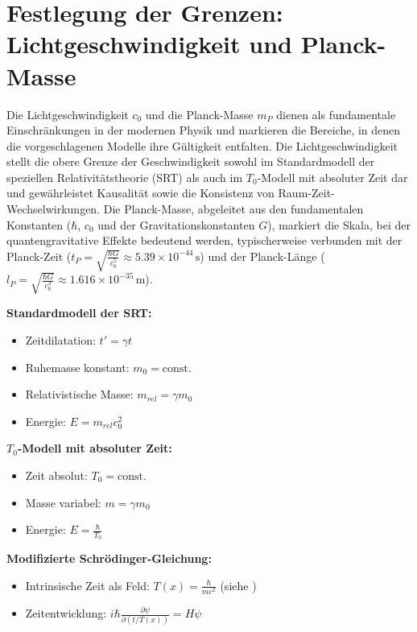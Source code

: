 \documentclass[a4paper,12pt]{article}
\newcommand{\Tfield}{T(x)}
\begin{document}
	\section{Festlegung der Grenzen: Lichtgeschwindigkeit und Planck-Masse}
	Die Lichtgeschwindigkeit \( c_0 \) und die Planck-Masse \( m_P \) dienen als fundamentale Einschränkungen in der modernen Physik und markieren die Bereiche, in denen die vorgeschlagenen Modelle ihre Gültigkeit entfalten. Die Lichtgeschwindigkeit stellt die obere Grenze der Geschwindigkeit sowohl im Standardmodell der speziellen Relativitätstheorie (SRT) als auch im \( T_0 \)-Modell mit absoluter Zeit dar und gewährleistet Kausalität sowie die Konsistenz von Raum-Zeit-Wechselwirkungen. Die Planck-Masse, abgeleitet aus den fundamentalen Konstanten (\( \hbar \), \( c_0 \) und der Gravitationskonstanten \( G \)), markiert die Skala, bei der quantengravitative Effekte bedeutend werden, typischerweise verbunden mit der Planck-Zeit (\( t_P = \sqrt{\frac{\hbar G}{c_0^5}} \approx 5.39 \times 10^{-44} \, \text{s} \)) und der Planck-Länge (\( l_P = \sqrt{\frac{\hbar G}{c_0^3}} \approx 1.616 \times 10^{-35} \, \text{m} \)).
	
	\begin{tcolorbox}[colback=blue!5!white,colframe=blue!75!black,title=Definitionen der Modelle]
		\textbf{Standardmodell der SRT:}
		\begin{itemize}
			\item Zeitdilatation: \( t' = \gamma t \)
			\item Ruhemasse konstant: \( m_0 = \text{const.} \)
			\item Relativistische Masse: \( m_{rel} = \gamma m_0 \)
			\item Energie: \( E = m_{rel}c_0^2 \)
		\end{itemize}
		
		\textbf{\( T_0 \)-Modell mit absoluter Zeit:}
		\begin{itemize}
			\item Zeit absolut: \( T_0 = \text{const.} \)
			\item Masse variabel: \( m = \gamma m_0 \)
			\item Energie: \( E = \frac{\hbar}{T_0} \)
		\end{itemize}
		
		\textbf{Modifizierte Schrödinger-Gleichung:}
		\begin{itemize}
			\item Intrinsische Zeit als Feld: \( \Tfield = \frac{\hbar}{mc^2} \) (siehe \cite{wesentlicheFormalismen}\relax)
			\item Zeitentwicklung: \( i\hbar\frac{\partial\psi}{\partial (t/\Tfield)} = H\psi \) %
		\end{itemize}
	\end{tcolorbox}
	
\end{document}
